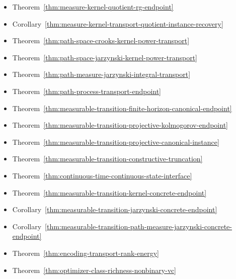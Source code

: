 \begin{itemize}
\item Theorem~\ref{thm:measure-kernel-quotient-rg-endpoint}
\item Corollary~\ref{thm:measure-kernel-transport-quotient-instance-recovery}
\item Theorem~\ref{thm:path-space-crooks-kernel-power-transport}
\item Theorem~\ref{thm:path-space-jarzynski-kernel-power-transport}
\item Theorem~\ref{thm:path-measure-jarzynski-integral-transport}
\item Theorem~\ref{thm:path-process-transport-endpoint}
\item Theorem~\ref{thm:measurable-transition-finite-horizon-canonical-endpoint}
\item Theorem~\ref{thm:measurable-transition-projective-kolmogorov-endpoint}
\item Theorem~\ref{thm:measurable-transition-projective-canonical-instance}
\item Theorem~\ref{thm:measurable-transition-constructive-truncation}
\item Theorem~\ref{thm:continuous-time-continuous-state-interface}
\item Theorem~\ref{thm:measurable-transition-kernel-concrete-endpoint}
\item Corollary~\ref{thm:measurable-transition-jarzynski-concrete-endpoint}
\item Corollary~\ref{thm:measurable-transition-path-measure-jarzynski-concrete-endpoint}
\item Theorem~\ref{thm:encoding-transport-rank-energy}
\item Theorem~\ref{thm:optimizer-class-richness-nonbinary-vc}
\end{itemize}

